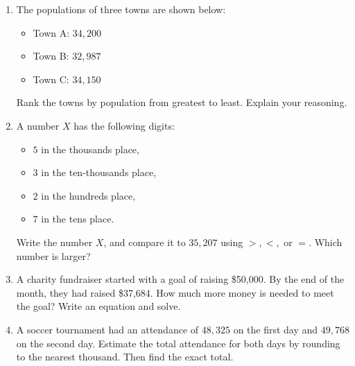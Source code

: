 \documentclass[12pt]{article}
\begin{document}
\begin{tcolorbox}[colframe=black!60, colback=white, 
coltitle=black, colbacktitle=black!15, fonttitle=\bfseries\Large, 
title=Problems, halign title=center, left=10pt, right=10pt, top=10pt, bottom=60pt]
\begin{enumerate}[start=9, itemsep=5em]
    \item The populations of three towns are shown below:
    \begin{itemize}
        \item Town A: \( 34,200 \)
        \item Town B: \( 32,987 \)
        \item Town C: \( 34,150 \)
    \end{itemize}
    Rank the towns by population from greatest to least. Explain your reasoning.

    \item A number \( X \) has the following digits:
    \begin{itemize}
        \item \( 5 \) in the thousands place,
        \item \( 3 \) in the ten-thousands place,
        \item \( 2 \) in the hundreds place,
        \item \( 7 \) in the tens place.
    \end{itemize}
    Write the number \( X \), and compare it to \( 35,207 \) using \( >, <, \) or \( = \). Which number is larger?

    \item A charity fundraiser started with a goal of raising \$50,000. By the end of the month, they had raised \$37,684. How much more money is needed to meet the goal? Write an equation and solve.

    \item A soccer tournament had an attendance of \( 48,325 \) on the first day and \( 49,768 \) on the second day. Estimate the total attendance for both days by rounding to the nearest thousand. Then find the exact total.

    \vspace{3.5em}
\end{enumerate}
\end{tcolorbox}


\vspace{1em}
\end{document}
